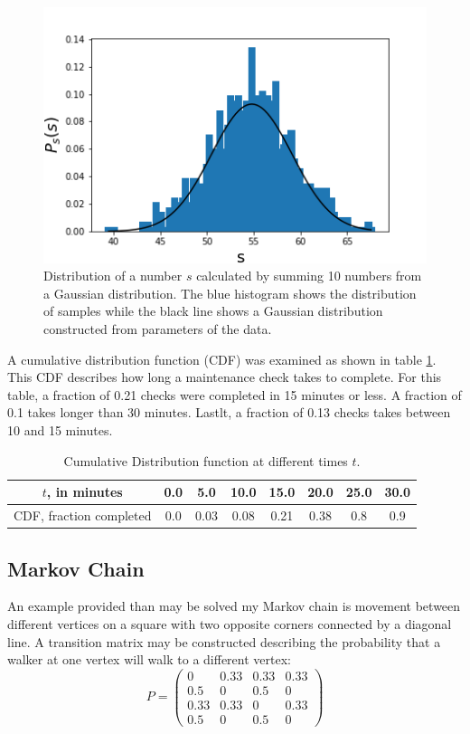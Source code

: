 \documentclass[twocolumn]{article}
\begin{document}
\begin{figure}
\centering
\includegraphics[width=\linewidth]{../Assn1/Gauss_sum}
\caption{Distribution of a number $s$ calculated by summing 10 numbers from a Gaussian distribution. The blue histogram shows the distribution of samples while the black line shows a Gaussian distribution constructed from parameters of the data.}
\label{fig:Gauss_sum}
\end{figure}

A cumulative distribution function (CDF) was examined as shown in table \ref{tab:CDF}. This CDF describes how long a maintenance check takes to complete. For this table, a fraction of 0.21 checks were completed in 15 minutes or less. A fraction of 0.1 takes longer than 30 minutes. Lastlt, a fraction of 0.13 checks takes between 10 and 15 minutes.

\begin{table}[h]
\begin{center}
\begin{tabular}{|c|c|c|c|c|c|c|c|}
	\hline $t$, in minutes & 0.0 & 5.0 &10.0  &15.0  &20.0  &25.0  &30.0  \\ 
	\hline  CDF, fraction completed &0.0  &0.03  &0.08  &0.21  &0.38  &0.8  &0.9  \\ 
	\hline 
\end{tabular} 
\end{center}
\caption{Cumulative Distribution function at different times $t$.}
\label{tab:CDF}
\end{table}

\subsection{Markov Chain}
An example provided than may be solved my Markov chain is movement between different vertices on a square with two opposite corners connected by a diagonal line. A transition matrix may be constructed describing the probability that a walker at one vertex will walk to a different vertex:
\[ P = \begin{pmatrix}
0 & 0.33 & 0.33 & 0.33 \\
0.5 & 0 & 0.5 & 0 \\
0.33 & 0.33 & 0 & 0.33 \\
0.5 & 0 & 0.5 & 0
\end{pmatrix} \]
\end{document}
